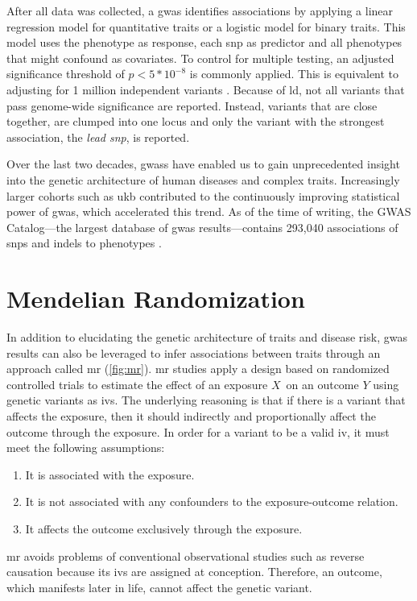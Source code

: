 \documentclass[twoside=false]{scrbook}
\begin{document}
After all data was collected, a \gls{gwas} identifies associations by applying a linear regression model for quantitative traits or a logistic model for binary traits.
This model uses the phenotype as response, each \gls{snp} as predictor and all phenotypes that might confound as covariates.
To control for multiple testing, an adjusted significance threshold of $p < 5 * 10^{-8}$ is commonly applied.
This is equivalent to adjusting for 1 million independent variants \cite{Belmont2005}.
Because of \gls{ld}, not all variants that pass genome-wide significance are reported.
Instead, variants that are close together, are clumped into one locus and only the variant with the strongest association, the \textit{lead \gls{snp}}, is reported.

Over the last two decades, \glspl{gwas} have enabled us to gain unprecedented insight into the genetic architecture of human diseases and complex traits.
Increasingly larger cohorts such as \gls{ukb} contributed to the continuously improving statistical power of \gls{gwas}, which accelerated this trend.
As of the time of writing, the GWAS Catalog---the largest database of \gls{gwas} results---contains 293,040 associations of \glspl{snp} and \glspl{indel} to phenotypes \cite{Buniello2019}.

\section{Mendelian Randomization}
In addition to elucidating the genetic architecture of traits and disease risk, \gls{gwas} results can also be leveraged to infer associations between traits through an approach called \gls{mr} (\cref{fig:mr}).
\Gls{mr} studies apply a design based on randomized controlled trials to estimate the effect of an exposure $X$ on an outcome $Y$ using genetic variants as \glspl{iv}.
The underlying reasoning is that if there is a variant that affects the exposure, then it should indirectly and proportionally affect the outcome through the exposure.
In order for a variant to be a valid \gls{iv}, it must meet the following assumptions:
\begin{enumerate}[label=\bfseries IV\arabic*)]
    \item It is associated with the exposure.
    \item It is not associated with any confounders to the exposure-outcome relation.
    \item It affects the outcome exclusively through the exposure.
\end{enumerate}
\Gls{mr} avoids problems of conventional observational studies such as reverse causation because its \glspl{iv} are assigned at conception.
Therefore, an outcome, which manifests later in life, cannot affect the genetic variant.
\end{document}

